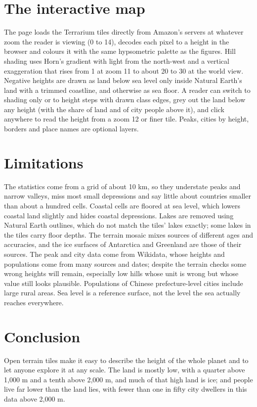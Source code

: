 \documentclass[11pt,a4paper]{article}
\begin{document}
\section{The interactive map}
The page loads the Terrarium tiles directly from Amazon's servers at whatever zoom the reader is viewing (0 to 14), decodes each pixel to a height in the browser and colours it with the same hypsometric palette as the figures. Hill shading uses Horn's gradient with light from the north-west and a vertical exaggeration that rises from 1 at zoom 11 to about 20 to 30 at the world view. Negative heights are drawn as land below sea level only inside Natural Earth's land with a trimmed coastline, and otherwise as sea floor. A reader can switch to shading only or to height steps with drawn class edges, grey out the land below any height (with the share of land and of city people above it), and click anywhere to read the height from a zoom 12 or finer tile. Peaks, cities by height, borders and place names are optional layers.

\section{Limitations}
The statistics come from a grid of about 10 km, so they understate peaks and narrow valleys, miss most small depressions and say little about countries smaller than about a hundred cells. Coastal cells are floored at sea level, which lowers coastal land slightly and hides coastal depressions. Lakes are removed using Natural Earth outlines, which do not match the tiles' lakes exactly; some lakes in the tiles carry floor depths. The terrain mosaic mixes sources of different ages and accuracies, and the ice surfaces of Antarctica and Greenland are those of their sources. The peak and city data come from Wikidata, whose heights and populations come from many sources and dates; despite the terrain checks some wrong heights will remain, especially low hills whose unit is wrong but whose value still looks plausible. Populations of Chinese prefecture-level cities include large rural areas. Sea level is a reference surface, not the level the sea actually reaches everywhere.

\section{Conclusion}
Open terrain tiles make it easy to describe the height of the whole planet and to let anyone explore it at any scale. The land is mostly low, with a quarter above 1,000 m and a tenth above 2,000 m, and much of that high land is ice; and people live far lower than the land lies, with fewer than one in fifty city dwellers in this data above 2,000 m.
\end{document}
